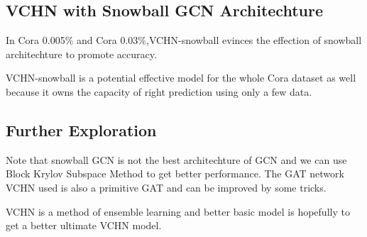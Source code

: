 \documentclass{article}
\begin{document}
\subsection{VCHN with Snowball GCN Architechture}
In Cora 0.005\% and Cora 0.03\%,VCHN-snowball evinces the effection of snowball architechture to promote accuracy.


VCHN-snowball is a potential effective model for the whole Cora dataset as well because it owns the capacity of right prediction using only a few data.
\subsection{Further Exploration}
Note that snowball GCN is not the best architechture of GCN and we can use Block Krylov Subspace Method to get better performance. \cite{snowball}
The GAT network VCHN used is also a primitive GAT and can be improved by some tricks. \cite{tricks}


VCHN is a method of ensemble learning and better basic model is hopefully to get a better ultimate VCHN model.


\end{document}
